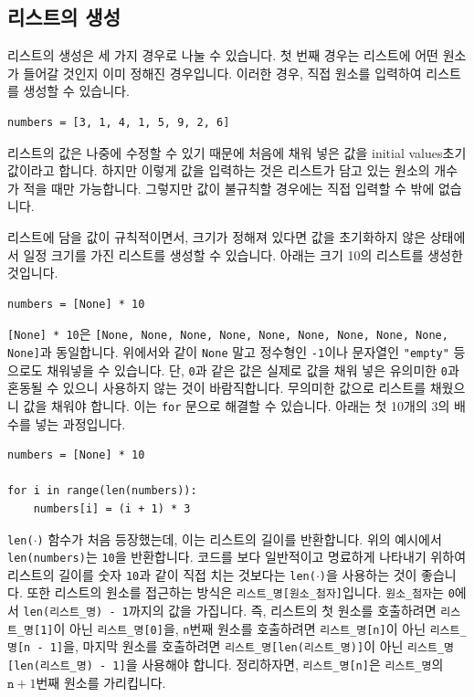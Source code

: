 \documentclass[../main.tex]{subfiles}
\begin{document}
\subsection{리스트의 생성}
리스트의 생성은 세 가지 경우로 나눌 수 있습니다.
첫 번째 경우는 리스트에 어떤 원소가 들어갈 것인지 이미 정해진 경우입니다.
이러한 경우, 직접 원소를 입력하여 리스트를 생성할 수 있습니다.
\begin{verbatim}
numbers = [3, 1, 4, 1, 5, 9, 2, 6]
\end{verbatim}
리스트의 값은 나중에 수정할 수 있기 때문에 처음에 채워 넣은 값을 initial values초기값이라고 합니다.
하지만 이렇게 값을 입력하는 것은 리스트가 담고 있는 원소의 개수가 적을 때만 가능합니다.
그렇지만 값이 불규칙할 경우에는 직접 입력할 수 밖에 없습니다.

리스트에 담을 값이 규칙적이면서, 크기가 정해져 있다면 값을 초기화하지 않은 상태에서 일정 크기를 가진 리스트를 생성할 수 있습니다.
아래는 크기 10의 리스트를 생성한 것입니다.
\begin{verbatim}
numbers = [None] * 10
\end{verbatim}
\texttt{[None] * 10}은 \texttt{[None, None, None, None, None, None, None, None, None, None]}과 동일합니다.
위에서와 같이 \texttt{None} 말고 정수형인 \texttt{-1}이나 문자열인 \texttt{"empty"} 등으로도 채워넣을 수 있습니다.
단, \texttt{0}과 같은 값은 실제로 값을 채워 넣은 유의미한 \texttt{0}과 혼동될 수 있으니 사용하지 않는 것이 바람직합니다.
무의미한 값으로 리스트를 채웠으니 값을 채워야 합니다.
이는 \texttt{for} 문으로 해결할 수 있습니다.
아래는 첫 10개의 3의 배수를 넣는 과정입니다.
\begin{verbatim}
numbers = [None] * 10

for i in range(len(numbers)):
    numbers[i] = (i + 1) * 3
\end{verbatim}
\texttt{len($\cdot$)} 함수가 처음 등장했는데, 이는 리스트의 길이를 반환합니다.
위의 예시에서 \texttt{len(numbers)}는 \texttt{10}을 반환합니다.
코드를 보다 일반적이고 명료하게 나타내기 위하여 리스트의 길이를 숫자 \texttt{10}과 같이 직접 치는 것보다는 \texttt{len($\cdot$)}을 사용하는 것이 좋습니다.
또한 리스트의 원소를 접근하는 방식은 \texttt{리스트\_명[원소\_첨자]}입니다.
\texttt{원소\_첨자}는 \texttt{0}에서 \texttt{len(리스트\_명) - 1}까지의 값을 가집니다.
즉, 리스트의 첫 원소를 호출하려면 \texttt{리스트\_명[1]}이 아닌 \texttt{리스트\_명[0]}을, \texttt{n}번째 원소를 호출하려면 \texttt{리스트\_명[n]}이 아닌 \texttt{리스트\_명[n - 1]}을, 마지막 원소를 호출하려면 \texttt{리스트\_명[len(리스트\_명)]}이 아닌 \texttt{리스트\_명[len(리스트\_명) - 1]}을 사용해야 합니다.
정리하자면, \texttt{리스트\_명[n]}은 \texttt{리스트\_명}의 $\texttt{n} + 1$번째 원소를 가리킵니다.
\end{document}
